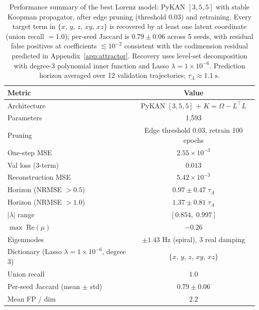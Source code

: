\documentclass{article}
\begin{document}
\begin{table}[ht]
      \centering
      \begin{tabular}{@{}lc@{}}
      \toprule
      Metric & Value \\
      \midrule
      Architecture & PyKAN $[3, 5, 5]$ + $K = \Omega -L^\top L$ \\
      Parameters & 1{,}593 \\
      Pruning & Edge threshold $0.03$, retrain 100 epochs \\
      \midrule
      One-step MSE & $2.55 \times 10^{-3}$ \\
      Val loss (3-term) & $0.013$ \\
      Reconstruction MSE & $5.42 \times 10^{-3}$ \\
      Horizon (NRMSE $> 0.5$) & $0.97 \pm 0.47\;\tau_\Lambda$ \\
      Horizon (NRMSE $> 1.0$) & $1.37 \pm 0.81\;\tau_\Lambda$ \\
      \midrule
      $|\lambda|$ range & $[0.854,\; 0.997]$ \\
      $\max\;\text{Re}(\mu)$ & $-0.26$ \\
      Eigenmodes & $\pm 1.43$ Hz (spiral), 3 real damping \\
      \midrule
      Dictionary (Lasso $\lambda = 1\!\times\!10^{-6}$, degree 3) & $\{x,\, y,\, z,\, xy,\, xz\}$ \\
      Union recall & $1.0$ \\
      Per-seed Jaccard (mean $\pm$ std) & $0.79 \pm 0.06$ \\
      Mean FP / dim & $2.2$ \\
      \bottomrule
      \end{tabular}
      \caption{Performance summary of the best Lorenz model: PyKAN $[3,5,5]$ with
      stable Koopman propagator, after edge pruning (threshold $0.03$) and retraining.
      Every target term in $\{x,\,y,\,z,\,xy,\,xz\}$ is recovered by at least one latent
      coordinate (union recall $= 1.0$); per-seed Jaccard is $0.79 \pm 0.06$ across 5 seeds,
      with residual false positives at coefficients $\lesssim 10^{-2}$ consistent with the
      codimension residual predicted in Appendix~\ref{app:attractor}. Recovery uses
      level-set decomposition with degree-3 polynomial inner function and Lasso
      $\lambda = 1\!\times\!10^{-6}$.
      Prediction horizon averaged over 12 validation trajectories;
      $\tau_\Lambda \approx 1.1\;\text{s}$.}
      \label{tab:lorenz_results}
  \end{table}
\end{document}
